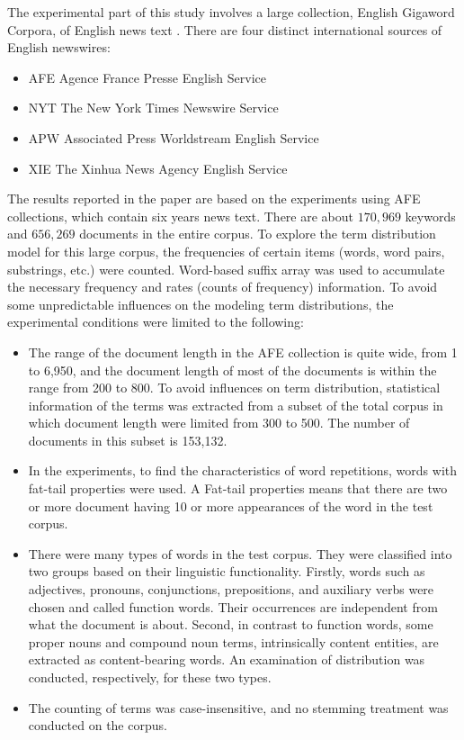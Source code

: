 \documentclass[english]{jnlp_1.4_rep}
\begin{document}
The experimental part of this study involves a large collection, English Gigaword Corpora, of
English news text \cite{LDC}. There are four distinct international sources of English newswires:
\begin{itemize}
    \item AFE  Agence France Presse English Service
    \item NYT  The New York Times Newswire Service
    \item APW  Associated Press Worldstream English Service
    \item XIE  The Xinhua News Agency English Service
\end{itemize}
The results reported in the paper are based on the experiments using AFE collections, which contain six years news text. There are about $170,969$
keywords and $656,269$ documents in the entire corpus. To explore the term distribution model for this large corpus, the frequencies of certain
items (words, word pairs, substrings, etc.) were counted. Word-based suffix array \cite{Manber90} was used to accumulate the necessary frequency and
rates (counts of frequency) information. To avoid some unpredictable influences on the modeling term distributions, the experimental conditions were
limited to the following:
\begin{itemize}
    \item The range of the document length in the AFE collection is quite wide, from 1 to 6,950, and
    the document length of most of the documents is within the range from 200 to 800. To avoid influences on
    term distribution, statistical information of the terms was extracted from a subset of the total corpus
    in which document length were limited from 300 to 500. The number of documents in this subset is
    153,132.
    \item In the experiments, to find the characteristics of word repetitions, words with fat-tail properties were used.
    A Fat-tail properties means that there are two or more document having 10 or more appearances of the word in the test corpus.
    \item There were many types of words in the test corpus. They were classified into two groups based on their linguistic
    functionality. Firstly, words such as adjectives, pronouns, conjunctions, prepositions,
    and auxiliary verbs were chosen and called function words.  Their occurrences
    are independent from what the document is about. Second, in contrast to function words, some proper
    nouns and compound noun terms, intrinsically content entities, are extracted as
    content-bearing words. An examination of distribution was conducted, respectively, for these two types.
    \item The counting of terms was case-insensitive, and no stemming treatment was conducted on
    the corpus.
\end{itemize}
\end{document}
